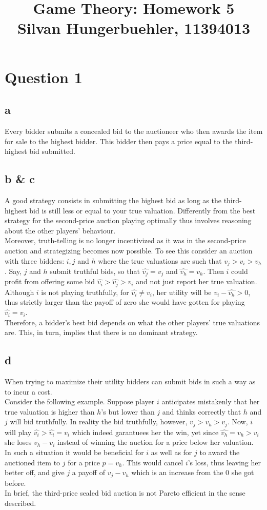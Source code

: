 \documentclass[10pt,a4paper]{article}
\title{%
  Game Theory: Homework 5 \\
  \large Silvan Hungerbuehler, 11394013}
\date{}
\begin{document}
\maketitle

\section*{Question 1}
\subsection*{a}
Every bidder submits a concealed bid to the auctioneer who then awards the item for sale to the highest bidder. This bidder then pays a price equal to the third-highest bid submitted.
\subsection*{b \& c}
A good strategy consists in submitting the highest bid as long as the third-highest bid is still less or equal to your true valuation. Differently from the best strategy for the second-price auction playing optimally thus involves reasoning about the other players' behaviour.\\
Moreover, truth-telling is no longer incentivized as it was in the second-price auction and strategizing becomes now possible. To see this consider an auction with three bidders: $i,j$ and $h$ where the true valuations are such that $v_j>v_i>v_h$. Say, $j$ and $h$ submit truthful bids, so that $\hat{v_j}=v_j$ and $\hat{v_h}=v_h$. Then $i$ could profit from offering some bid $\hat{v_i}>\hat{v_j}>v_i$ and not just report her true valuation. Although $i$ is not playing truthfully, for $\hat{v_i}\neq v_i$, her utility will be $v_i-\hat{v_h}>0$, thus strictly larger than the payoff of zero she would have gotten for playing $\hat{v_i}=v_i$.\\
Therefore, a bidder's best bid depends on what the other players' true valuations are. This, in turn, implies that there is no dominant strategy.
\subsection*{d}
When trying to maximize their utility bidders can submit bids in such a way as to incur a cost. \\
Consider the following example. Suppose player $i$ anticipates mistakenly that her true valuation is higher than $h$'s but lower than $j$ and thinks correctly that $h$ and $j$ will bid truthfully. In reality the bid truthfully, however, $v_j>v_h>v_j$. Now, $i$ will play $\hat{v_{i}}>\hat{v_i}=v_i$ which indeed garantuees her the win, yet since $\hat{v_h}=v_h>v_i$ she loses $v_h-v_i$ instead of winning the auction for a price below her valuation.\\
In such a situation it would be beneficial for $i$ as well as for $j$ to award the auctioned item to $j$ for a price $p=v_h$. This would cancel $i$'s loss, thus leaving her better off, and give $j$ a payoff of $v_j-v_h$ which is an increase from the $0$ she got before.\\
In brief, the third-price sealed bid auction is not Pareto efficient in the sense described.
\end{document}
